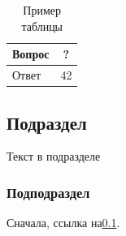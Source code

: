 \documentclass[intlimits,twoside,a4paper,11pt]{article}
\begin{document}
\begin{table}[H]
\centering
\caption{Пример таблицы}
\label{table-example}
\small
\begin{tabular}{|p{5cm}|c|}
	\hline
	\centering
	Вопрос & ? \\
	\hline
	Ответ & 42 \\
	\hline
\end{tabular}
\end{table}

\subsection{Подраздел}
\label{sec:sub} %
Текст в подразделе

\subsubsection{Подподраздел}
Сначала, ссылка на\ref{sec:sub}.
\end{document}
